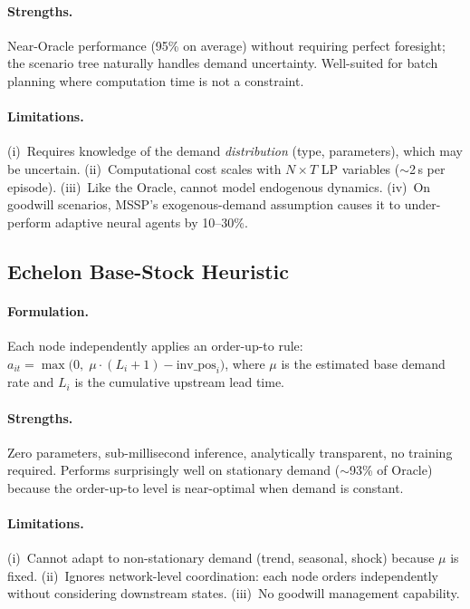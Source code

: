 \paragraph{Strengths.} Near-Oracle performance (95\% on average) without
requiring perfect foresight; the scenario tree naturally handles demand
uncertainty. Well-suited for batch planning where computation time is
not a constraint.

\paragraph{Limitations.} (i)~Requires knowledge of the demand
\emph{distribution} (type, parameters), which may be uncertain.
(ii)~Computational cost scales with $N \times T$ LP variables
($\sim$2\,s per episode). (iii)~Like the Oracle, cannot model
endogenous dynamics. (iv)~On goodwill scenarios, MSSP's
exogenous-demand assumption causes it to under-perform
adaptive neural agents by 10--30\%.

\subsection{Echelon Base-Stock Heuristic}

\paragraph{Formulation.}
Each node independently applies an order-up-to rule:
$a_{it} = \max\!\bigl(0,\; \mu \cdot (L_i + 1) - \text{inv\_pos}_i\bigr)$,
where $\mu$ is the estimated base demand rate and $L_i$ is the cumulative
upstream lead time.

\paragraph{Strengths.} Zero parameters, sub-millisecond inference,
analytically transparent, no training required. Performs surprisingly
well on stationary demand ($\sim$93\% of Oracle) because the
order-up-to level is near-optimal when demand is constant.

\paragraph{Limitations.} (i)~Cannot adapt to non-stationary demand (trend,
seasonal, shock) because $\mu$ is fixed. (ii)~Ignores network-level
coordination: each node orders independently without considering
downstream states. (iii)~No goodwill management capability.

